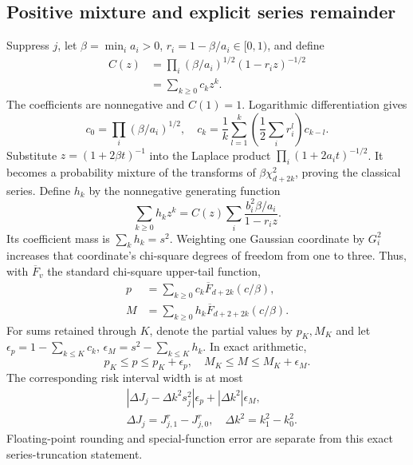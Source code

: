 \subsection{Positive mixture and explicit series remainder}
Suppress $j$, let $\beta=\min_i a_i>0$, $r_i=1-\beta/a_i\in[0,1)$, and define
\begin{align*}
C(z)&=\prod_i(\beta/a_i)^{1/2}(1-r_iz)^{-1/2}\\
&=\sum_{k\ge0}c_kz^k.
\end{align*}
The coefficients are nonnegative and $C(1)=1$.
Logarithmic differentiation gives
\[
c_0=\prod_i(\beta/a_i)^{1/2},\quad
c_k=\frac1k\sum_{l=1}^k\left(\frac12\sum_i r_i^l\right)c_{k-l}.
\]
Substitute $z=(1+2\beta t)^{-1}$ into the Laplace product $\prod_i(1+2a_it)^{-1/2}$.
It becomes a probability mixture of the transforms of $\beta\chi^2_{d+2k}$, proving the classical series.
Define $h_k$ by the nonnegative generating function
\[
\sum_{k\ge0}h_kz^k=C(z)\sum_i\frac{b_i^2\beta/a_i}{1-r_iz}.
\]
Its coefficient mass is $\sum_kh_k=s^2$.
Weighting one Gaussian coordinate by $G_i^2$ increases that coordinate's chi-square degrees of freedom from one to three.
Thus, with $\overline F_v$ the standard chi-square upper-tail function,
\begin{align*}
p&=\sum_{k\ge0}c_k\overline F_{d+2k}(c/\beta),\\
M&=\sum_{k\ge0}h_k\overline F_{d+2+2k}(c/\beta).
\end{align*}
For sums retained through $K$, denote the partial values by $p_K,M_K$ and let
$\epsilon_p=1-\sum_{k\le K}c_k$, $\epsilon_M=s^2-\sum_{k\le K}h_k$.
In exact arithmetic,
\[
p_K\le p\le p_K+\epsilon_p,\quad
M_K\le M\le M_K+\epsilon_M.
\]
The corresponding risk interval width is at most
\begin{align*}
&|\Delta J_j-\Delta k^2s_j^2|\epsilon_p+|\Delta k^2|\epsilon_M,\\
&\Delta J_j=J_{j,1}^{r}-J_{j,0}^{r},\quad \Delta k^2=k_1^2-k_0^2.
\end{align*}
Floating-point rounding and special-function error are separate from this exact series-truncation statement.

